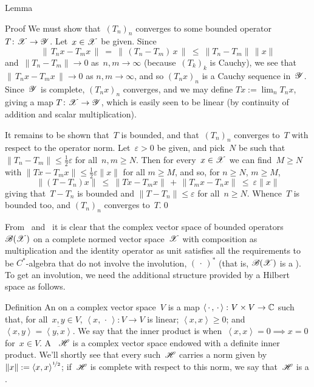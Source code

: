 \documentclass[main]{subfiles}
\begin{document}
\begin{parsec}[hilb]
\begin{point}{Lemma}
\begin{point}{Proof}
We must show that~$(T_n)_n$ converges to some
bounded operator $T\colon \mathscr{X}\to\mathscr{Y}$.
Let~$x\in \mathscr{X}$ be given.
Since 
\begin{equation*}
\|\,T_nx - T_mx\,\|\ =\ \|\,(T_n-T_m)\,x\,\|\ \leq\  \|T_n-T_m\|\,\|x\|
\end{equation*}
and~$\|T_n-T_m\|\to 0$ as~$n,m\to \infty$ 
(because~$(T_k)_k$ is Cauchy),
we see that $\|\,T_nx-T_mx\,\|\to 0$ as $n,m\to \infty$,
and so $(T_nx)_n$ is a Cauchy sequence in~$\mathscr{Y}$.
Since~$\mathscr{Y}$ is complete,
 $(T_nx)_n$ converges,
and  we may define $Tx:=\lim_n T_nx$,
giving a map $T\colon \mathscr{X}\to \mathscr{Y}$,
which is easily seen to be linear
(by continuity of addition and scalar multiplication).

It remains to be shown that~$T$ is bounded,
and that~$(T_n)_n$ converges to~$T$ with respect to the operator norm.
Let~$\varepsilon>0$ be given, and pick~$N$ be such that
$\|T_n-T_m\|\leq \frac{1}{2}\varepsilon$ for all~$n,m\geq N$.
Then for every~$x\in \mathscr{X}$
we can find~$M\geq N$ with 
$\|T x - T_m x\|\leq \frac{1}{2}\varepsilon\|x\|$ for all $m\geq M$,
and so,
for $n\geq N$, $m\geq M$,
\begin{equation*}
\|(T - T_n) x\| \ \leq\ \|T x - T_mx\|\,+\,\|T_m x - T_n x\|
\ \leq\  \varepsilon\|x\|
\end{equation*}
giving that~$T-T_n$ is bounded
and $\|T-T_n\|\leq \varepsilon$ for all~$n\geq N$.
Whence~$T$ is bounded too,
and $(T_n)_n$ converges to~$T$.\qed
\end{point}
\end{point}
\begin{point}%
From~
and~
it is clear that the complex vector space
of bounded operators~$\mathscr{B}(\mathscr{X})$
on a complete normed vector space~$\mathscr{X}$
with composition as multiplication
and the identity operator as unit
satisfies all the requirements
to be $C^*$-algebra that do not involve the involution, $(\,\cdot\,)^*$
(that is, $\mathscr{B}(\mathscr{X})$ is a ).
To get an involution,
we need the additional structure
provided by a Hilbert space as follows.
\end{point}
\begin{point}{Definition}%
An 
on a complex vector space~$V$ 
is a map $\left<\,\cdot\,,\,\cdot\,\right>\colon V\times V\to \mathbb{C}$
such that,
for all~$x,y\in V$,
$\left<x,\,\cdot\,\right>\colon V\to V$ is linear;
$\left<x,x\right>\geq 0$;
and
$\left<x,y\right>=\overline{\left<y,x\right>}$.
We say that the inner product is 
when~$\left<x,x\right>=0\implies x=0$ for~$x\in V$.
A ~$\mathscr{H}$
is a complex vector space endowed with a definite inner product.
We'll shortly see that every such~$\mathscr{H}$
carries a norm
given by
 $\|x\|:= \left<x,x\right>^{\nicefrac{1}{2}}$;
if~$\mathscr{H}$ is complete with respect to this norm,
we say that~$\mathscr{H}$ is a .


\end{point}
\end{parsec}
\end{document}

